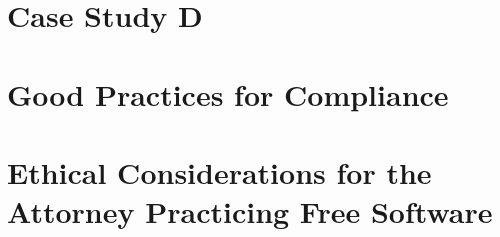 \documentclass[12pt]{report}
\begin{document}
\chapter{Case Study D}

\chapter{Good Practices for Compliance}
\chapter{Ethical Considerations for the Attorney Practicing Free Software}
\end{document}
